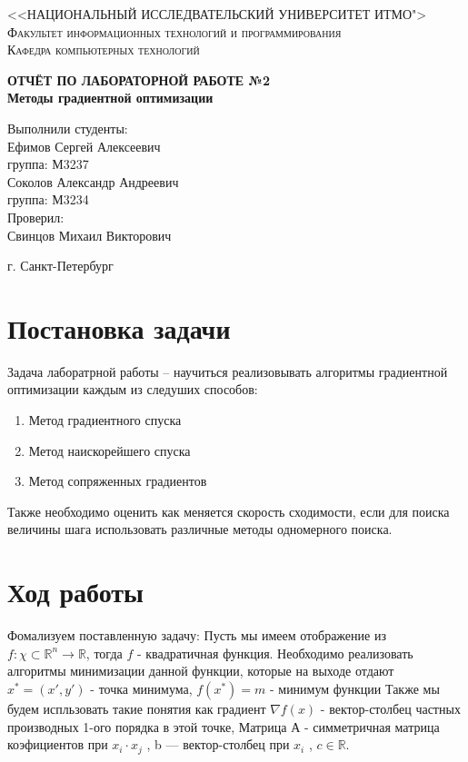 \documentclass[a4paper, 14pt]{article}
\begin{document}
	\renewcommand{\chaptername}{Лабораторная работа}
	\def\contentsname{Содержание}

	\begin{titlepage}
		\begin{center}
			\textsc{<<НАЦИОНАЛЬНЫЙ ИССЛЕДВАТЕЛЬСКИЙ УНИВЕРСИТЕТ ИТМО">\\[5mm]
			Факультет информационных технологий и программирования\\[2mm]
			Кафедра компьютерных технологий}

			\vfill

			\textbf{ОТЧЁТ ПО ЛАБОРАТОРНОЙ РАБОТЕ №2\\[3mm]
			Методы градиентной оптимизации\\[28mm]
			}
		\end{center}

		\hfill
		\begin{minipage}{.5\textwidth}
			Выполнили студенты:\\[2mm]
			Ефимов Сергей Алексеевич\\
			группа: М3237\\[2mm]
			Соколов Александр Андреевич\\
			группа: М3234\\[5mm]

			Проверил:\\[2mm]
			Свинцов Михаил Викторович
		\end{minipage}%
		\vfill
		\begin{center}
			г. Санкт-Петербург
		\end{center}
	\end{titlepage}


	\section*{Постановка задачи}
	Задача лаборатрной работы  -- научиться реализовывать алгоритмы градиентной оптимизации каждым из следуших способов:
	\begin{enumerate}
		\item Метод градиентного спуска
		\item Метод наискорейшего спуска
		\item Метод сопряженных градиентов
	\end{enumerate}
	Также необходимо оценить как меняется скорость сходимости, если для поиска величины шага использовать различные методы одномерного поиска.
	\section*{Ход работы}
	Фомализуем поставленную задачу:
	Пусть мы имеем отображение из $f: \chi \subset \mathbb{R}^n \longrightarrow \mathbb{R}$, тогда $f$ - квадратичная функция. Необходимо реализовать алгоритмы минимизации данной функции, которые на выходе отдают $x^* = (x', y')$ - точка минимума, $f(x^*) = m$ - минимум функции
	Также мы будем испльзовать такие понятия как градиент $\nabla f(x)$ - вектор-столбец частных производных 1-ого порядка в этой точке, Матрица А - симметричная матрица коэфициентов при $x_i \cdot x_j$ , b — вектор-столбец при $x_i$ , $c \in \mathbb{R}$.	
\end{document}
